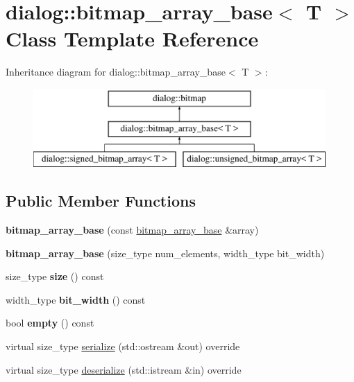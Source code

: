 \hypertarget{classdialog_1_1bitmap__array__base}{}\section{dialog\+:\+:bitmap\+\_\+array\+\_\+base$<$ T $>$ Class Template Reference}
\label{classdialog_1_1bitmap__array__base}
Inheritance diagram for dialog\+:\+:bitmap\+\_\+array\+\_\+base$<$ T $>$\+:\begin{figure}[H]
\begin{center}
\leavevmode
\includegraphics[height=3.000000cm]{classdialog_1_1bitmap__array__base}
\end{center}
\end{figure}
\subsection*{Public Member Functions}
\begin{DoxyCompactItemize}
\item 
\mbox{\label{classdialog_1_1bitmap__array__base_ab6b857655a8de2706653b5a7996a625b}} 
{\bfseries bitmap\+\_\+array\+\_\+base} (const \hyperlink{classdialog_1_1bitmap__array__base}{bitmap\+\_\+array\+\_\+base} \&array)
\item 
\mbox{\label{classdialog_1_1bitmap__array__base_ac60cc574d5908417b53bfbd7a5809626}} 
{\bfseries bitmap\+\_\+array\+\_\+base} (size\+\_\+type num\+\_\+elements, width\+\_\+type bit\+\_\+width)
\item 
\mbox{\label{classdialog_1_1bitmap__array__base_a9bbb84f69a124c0a3b654e8570833fd8}} 
size\+\_\+type {\bfseries size} () const
\item 
\mbox{\label{classdialog_1_1bitmap__array__base_ada6add4a94341c88dc41de234b090ccb}} 
width\+\_\+type {\bfseries bit\+\_\+width} () const
\item 
\mbox{\label{classdialog_1_1bitmap__array__base_ab7816447c88267c25987ad45ceb65a5e}} 
bool {\bfseries empty} () const
\item 
virtual size\+\_\+type \hyperlink{classdialog_1_1bitmap__array__base_aa7a0aa644a5a37eaf87a902a20cee939}{serialize} (std\+::ostream \&out) override
\item 
virtual size\+\_\+type \hyperlink{classdialog_1_1bitmap__array__base_a51a91fced01d96475dc24e23da2d06e8}{deserialize} (std\+::istream \&in) override
\end{DoxyCompactItemize}
